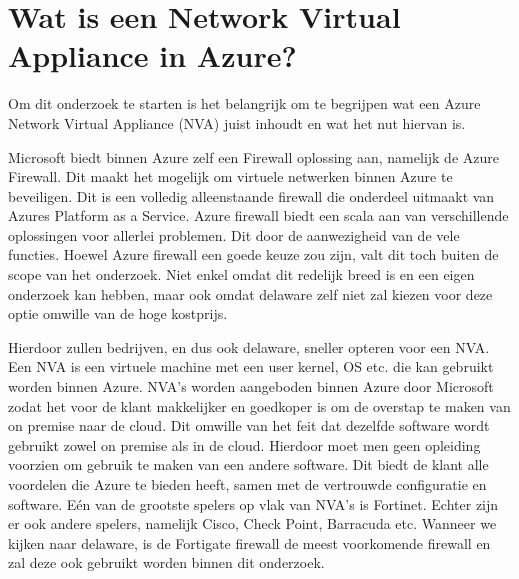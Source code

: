\newpage
\section{Wat is een Network Virtual Appliance in Azure?}
Om dit onderzoek te starten is het belangrijk om te begrijpen wat een Azure Network Virtual Appliance (NVA) juist inhoudt en wat het nut hiervan is.

Microsoft biedt binnen Azure zelf een Firewall oplossing aan, namelijk de Azure Firewall. Dit maakt het mogelijk om virtuele netwerken binnen Azure te beveiligen. \autocite{Cooke} Dit is een volledig alleenstaande firewall die onderdeel uitmaakt van Azures Platform as a Service. Azure firewall biedt een scala aan van verschillende oplossingen voor allerlei problemen. Dit door de aanwezigheid van de vele functies. \autocite{Seferlis2018} Hoewel Azure firewall een goede keuze zou zijn, valt dit toch buiten de scope van het onderzoek. Niet enkel omdat dit redelijk breed is en een eigen onderzoek kan hebben, maar ook omdat delaware zelf niet zal kiezen voor deze optie omwille van de hoge kostprijs.

Hierdoor zullen bedrijven, en dus ook delaware, sneller opteren voor een NVA. Een NVA is een virtuele machine met een user kernel, OS etc. die kan gebruikt worden binnen Azure. NVA's worden aangeboden binnen Azure door Microsoft zodat het voor de klant makkelijker en goedkoper is om de overstap te maken van on premise naar de cloud. Dit omwille van het feit dat dezelfde software wordt gebruikt zowel on premise als in de cloud. Hierdoor moet men geen opleiding voorzien om gebruik te maken van een andere software. Dit biedt de klant alle voordelen die Azure te bieden heeft, samen met de vertrouwde configuratie en software. Eén van de grootste spelers op vlak van NVA's is Fortinet. Echter zijn er ook andere spelers, namelijk Cisco, Check Point, Barracuda etc. \autocite{MicrosoftNVA} Wanneer we kijken naar delaware, is de Fortigate firewall de meest voorkomende firewall en zal deze ook gebruikt worden binnen dit onderzoek. 

